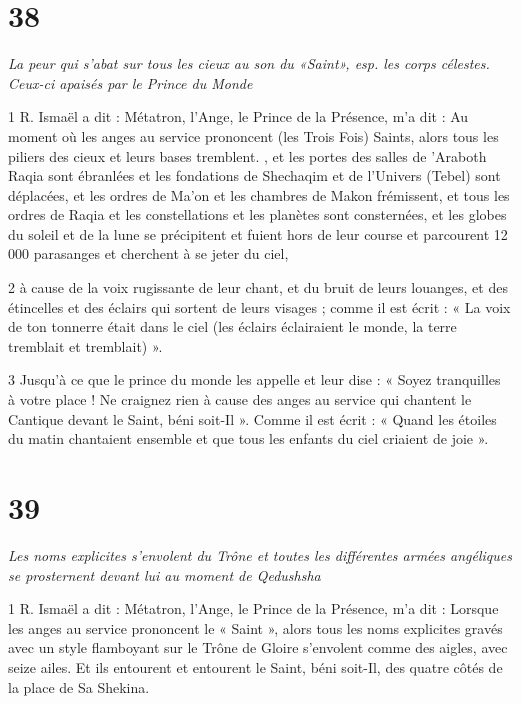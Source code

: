 \chapter{38}

\par \textit{La peur qui s'abat sur tous les cieux au son du «Saint», esp. les corps célestes. Ceux-ci apaisés par le Prince du Monde}

\par 1 R. Ismaël a dit : Métatron, l'Ange, le Prince de la Présence, m'a dit : Au moment où les anges au service prononcent (les Trois Fois) Saints, alors tous les piliers des cieux et leurs bases tremblent. , et les portes des salles de 'Araboth Raqia sont ébranlées et les fondations de Shechaqim et de l'Univers (Tebel) sont déplacées, et les ordres de Ma'on et les chambres de Makon frémissent, et tous les ordres de Raqia et les constellations et les planètes sont consternées, et les globes du soleil et de la lune se précipitent et fuient hors de leur course et parcourent 12 000 parasanges et cherchent à se jeter du ciel,

\par 2 à cause de la voix rugissante de leur chant, et du bruit de leurs louanges, et des étincelles et des éclairs qui sortent de leurs visages ; comme il est écrit : « La voix de ton tonnerre était dans le ciel (les éclairs éclairaient le monde, la terre tremblait et tremblait) ».

\par 3 Jusqu'à ce que le prince du monde les appelle et leur dise : « Soyez tranquilles à votre place ! Ne craignez rien à cause des anges au service qui chantent le Cantique devant le Saint, béni soit-Il ». Comme il est écrit : « Quand les étoiles du matin chantaient ensemble et que tous les enfants du ciel criaient de joie ».



\chapter{39}

\par \textit{Les noms explicites s'envolent du Trône et toutes les différentes armées angéliques se prosternent devant lui au moment de Qedushsha}

\par 1 R. Ismaël a dit : Métatron, l'Ange, le Prince de la Présence, m'a dit : Lorsque les anges au service prononcent le « Saint », alors tous les noms explicites gravés avec un style flamboyant sur le Trône de Gloire s'envolent comme des aigles, avec seize ailes. Et ils entourent et entourent le Saint, béni soit-Il, des quatre côtés de la place de Sa Shekina.

